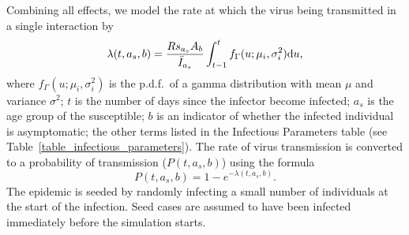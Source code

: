 \documentclass[11pt, oneside]{amsart}   	%
\begin{document}
Combining all effects, we model the rate at which the virus being transmitted in a single interaction by
\begin{equation}
\lambda(t,a_s,b) = \frac{R s_{a_s}A_b}{ \bar I_{a_s}} \int_{t-1}^t f_{\Gamma}(u; \mu_i,\sigma_i^2) {\rm d}u,
\end{equation}
where $f_{\Gamma}(u; \mu_i,\sigma_i^2)$ is the p.d.f.\ of a gamma distribution with mean $\mu$ and variance $\sigma^2$; $t$ is the number of days since the infector become infected; $a_s$ is the age group of the susceptible; $b$ is an indicator of whether the infected individual is asymptomatic; the other terms listed in the Infectious Parameters table  (see Table~\ref{table_infectious_parameters}).
The rate of virus transmission is converted to a probability of transmission  ($P(t,a_s,b)$) using the formula
\begin{equation}
P(t,a_s,b) = 1 - e^{-\lambda(t,a_s,b)}.
\end{equation}
The epidemic is seeded by randomly infecting a small number of individuals at the start of the infection.  Seed cases are assumed to have been infected immediately before the simulation starts.
\end{document}
